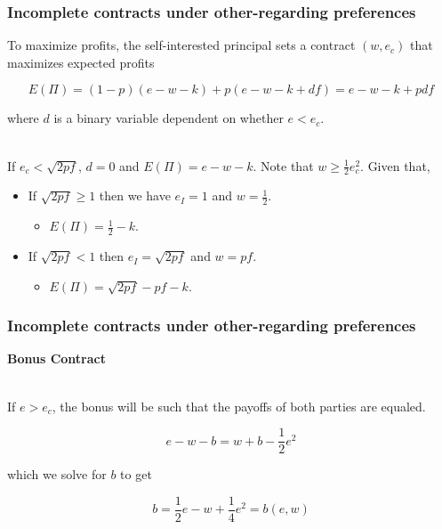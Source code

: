 \documentclass{beamer}
\begin{document}
\begin{frame}
	\frametitle{Incomplete contracts under other-regarding preferences}

To maximize profits, the self-interested principal sets a contract $\left(w,e_c\right)$ that maximizes expected profits

\begin{equation}
	E\left(\Pi\right) = \left(1-p\right)\left(e-w-k\right)+p\left(e-w-k+df\right) = e-w-k+pdf
\end{equation}
	

where $d$ is a binary variable dependent on whether $e < e_c$.  \\~\

If $e_c < \sqrt{2pf}$, $d=0$ and $E(\Pi) = e - w - k$. Note that $w \geq \frac{1}{2}e^2_c$. Given that, 

\begin{itemize}
\item If $\sqrt{2pf} \geq 1$ then we have $e_I = 1$ and $w=\frac{1}{2}$. 
\begin{itemize}
\item  $E\left(\Pi\right) = \frac{1}{2} - k$.
\end{itemize}
\item If $\sqrt{2pf} < 1$ then $e_I = \sqrt{2pf}$ and $w=pf$.
\begin{itemize}
\item $E\left(\Pi\right) = \sqrt{2pf} - pf - k$. 
\end{itemize}
\end{itemize}	
	
\end{frame}

\begin{frame}
	\frametitle{Incomplete contracts under other-regarding preferences}
	\textbf{Bonus Contract} \\~\

If $e > e_c$, the bonus will be such that the payoffs of both parties are equaled. 


\begin{equation}
e - w - b = w + b - \frac{1}{2} e^2
\end{equation} 

\noindent
which we solve for $b$ to get

\begin{equation}
	b = \frac{1}{2} e - w + \frac{1}{4}e^2 = b\left(e,w\right)
\end{equation}	
	
\end{frame}
\end{document}
